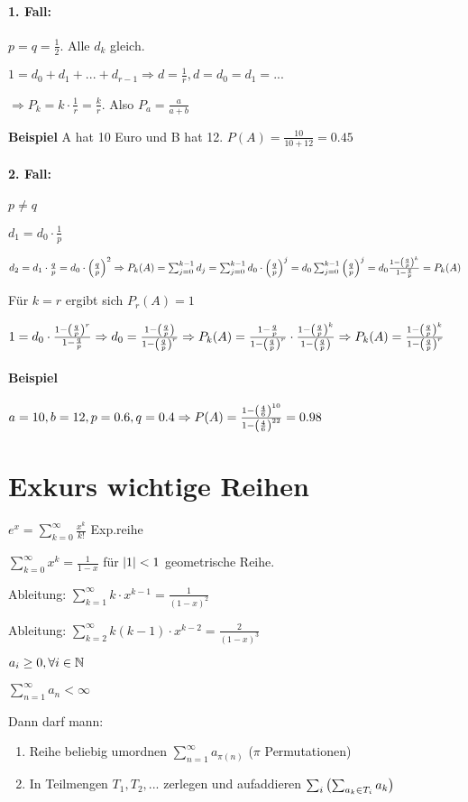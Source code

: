 \paragraph{1. Fall:} $p=q=\frac{1}{2}$. Alle $d_k$ gleich.

$1=d_0 + d_1 + ... + d_{r-1} \Rightarrow d=\frac{1}{r}, d = d_0 = d_1 = ... $

$\Rightarrow P_k = k \cdot \frac{1}{r} = \frac{k}{r}$. Also $P_a = \frac{a}{a+b}$

\textbf{Beispiel} A hat 10 Euro und B hat 12. $P(A) = \frac{10}{10+12} = 0.45$

\paragraph{2. Fall:} $p\neq q$

$d_1 = d_0 \cdot \frac{1}{p}$

$d_2 = d_1 \cdot \frac{q}{p}
= d_0 \cdot  \left( \frac{q}{p} \right) ^2
\Rightarrow P_k(A) = \sum_{j=0}^{k-1} d_j
= \sum_{j=0}^{k-1} d_0 \cdot  \left( \frac{q}{p} \right) ^j
= d_0 \sum_{j=0}^{k-1}  \left( \frac{q}{p} \right) ^j
= d_0 \frac{1 -  \left( \frac{q}{p} \right) ^k}{1 - \frac{q}{p}}
= P_k(A)
$

Für $k=r$ ergibt sich 
$P_r(A) = 1$

$ 
1 = d_0 \cdot \frac{1 -  \left( \frac{q}{p} \right) ^r}{1 - \frac{q}{p}}
\Rightarrow d_0 = \frac{1 -  \left(  \frac{q}{p}  \right)  }{1 -  \left(  \frac{q}{p}  \right) ^r }
\Rightarrow P_k(A) = \frac{1 - \frac{q}{p} }{1 -  \left(  \frac{q}{p}  \right) ^r } \cdot \frac{1 -  \left( \frac{q}{p} \right) ^k }{1 -  \left(  \frac{q}{p}  \right)  }
\Rightarrow P_k(A) = \frac{1 -  \left( \frac{q}{p} \right) ^k }{1 -  \left(  \frac{q}{p}  \right) ^r }
$

\paragraph{Beispiel}
$ a=10, b=12, p=0.6, q=0.4 \Rightarrow P(A) = \frac{1 -  \left( \frac{4}{6} \right) ^{10} }{1- \left( \frac{4}{6} \right) ^{22} } = 0.98$
 
\section{Exkurs wichtige Reihen}
$
e^x 
= \sum_{k=0}^{\infty} \frac{x^k}{k!}
$
Exp.reihe

$\sum_{k=0}^{\infty} x^k = \frac{1}{1-x}$ für $ \left\vert 1 \right\vert  < 1$ geometrische Reihe. 

Ableitung: 
$\sum_{k=1}^{\infty} k\cdot x^{k-1} = \frac{1}{(1-x)^2}$

Ableitung: 
$\sum_{k=2}^{\infty} k (k-1) \cdot x^{k-2} = \frac{2}{(1-x)^3}$

\begin{satz}[Umordnungssatz]
$a_i \geq 0, \forall i\in \mathbb{N}$

$\sum_{n=1}^{\infty} a_n < \infty$

Dann darf mann: 
\begin{enumerate}
\item Reihe beliebig umordnen $\sum_{n=1}^{\infty} a_{\pi(n)}$ ($\pi$ Permutationen)
\item In Teilmengen $T_1, T_2, ... $ zerlegen und aufaddieren $\sum_{i}  \left(  \sum_{a_k \in T_i} a_k  \right) $
\end{enumerate}
\end{satz}